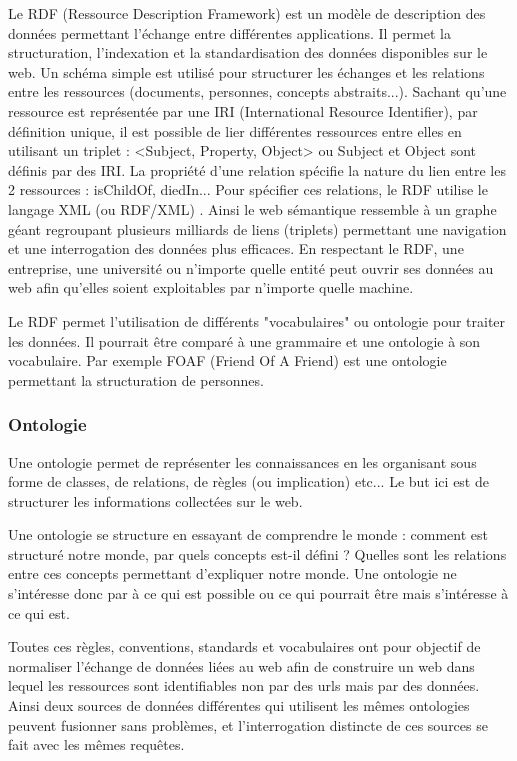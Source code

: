 \documentclass[12pt]{article}
\begin{document}
Le RDF (Ressource Description Framework) est un modèle de description des données permettant l'échange entre différentes applications. Il permet la structuration, l'indexation et la standardisation des données disponibles sur le web. Un schéma simple est utilisé pour structurer les échanges et les relations entre les ressources (documents, personnes, concepts abstraits...). Sachant qu'une ressource est représentée par une IRI (International Resource Identifier), par définition unique, il est possible de lier différentes ressources entre elles en utilisant un triplet : <Subject, Property, Object> ou Subject et Object sont définis par des IRI. La propriété d'une relation spécifie la nature du lien entre les 2 ressources : isChildOf, diedIn... Pour spécifier ces relations, le RDF utilise le langage XML (ou RDF/XML) \cite{rdf}.
\newline{}
Ainsi le web sémantique ressemble à un graphe géant regroupant plusieurs milliards de liens (triplets) permettant une navigation et une interrogation des données plus efficaces. En respectant le RDF, une entreprise, une université ou n'importe quelle entité peut ouvrir ses données au web afin qu'elles soient exploitables par n'importe quelle machine.

Le RDF permet l'utilisation de différents "vocabulaires" ou ontologie pour traiter les données. Il pourrait être comparé à une grammaire et une ontologie à son vocabulaire. Par exemple FOAF (Friend Of A Friend) est une ontologie permettant la structuration de personnes. \cite{foaf}

\subsubsection{Ontologie}

Une ontologie permet de représenter les connaissances en les organisant sous forme de classes, de relations, de règles (ou implication) etc... Le but ici est de structurer les informations collectées sur le web.

Une ontologie se structure en essayant de comprendre le monde : comment est structuré notre monde, par quels concepts est-il défini ? Quelles sont les relations entre ces concepts permettant d'expliquer notre monde. Une ontologie ne s'intéresse donc par à ce qui est possible ou ce qui pourrait être mais s'intéresse à ce qui est. \cite{shirky} \cite{schema}

Toutes ces règles, conventions, standards et vocabulaires ont pour objectif de normaliser l'échange de données liées au web afin de construire un web dans lequel les ressources sont identifiables non par des urls mais par des données. Ainsi deux sources de données différentes qui utilisent les mêmes ontologies peuvent fusionner sans problèmes, et l'interrogation distincte de ces sources se fait avec les mêmes requêtes.
\end{document}

